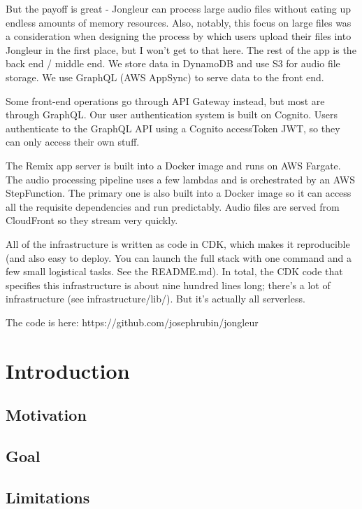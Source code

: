 \documentclass{article}
\begin{document}
But the payoff is great - Jongleur can process large audio files without eating up endless amounts of memory resources.
Also, notably, this focus on large files was a consideration when designing the process by which users upload their files into Jongleur in the first place, but I won't get to that here.
The rest of the app is the back end / middle end. We store data in DynamoDB and use S3 for audio file storage.
We use GraphQL (AWS AppSync) to serve data to the front end.

Some front-end operations go through API Gateway instead, but most are through GraphQL.
Our user authentication system is built on Cognito.
Users authenticate to the GraphQL API using a Cognito accessToken JWT, so they can only access their own stuff.

The Remix app server is built into a Docker image and runs on AWS Fargate.
The audio processing pipeline uses a few lambdas and is orchestrated by an AWS StepFunction.
The primary one is also built into a Docker image so it can access all the requisite dependencies and run predictably.
Audio files are served from CloudFront so they stream very quickly.

All of the infrastructure is written as code in CDK, which makes it reproducible (and also easy to deploy. You can launch the full stack with one command and a few small logistical tasks. See the README.md).
In total, the CDK code that specifies this infrastructure is about nine hundred lines long; there's a lot of infrastructure (see infrastructure/lib/).
But it's actually all serverless.

The code is here: https://github.com/josephrubin/jongleur


\section{Introduction}
\subsection{Motivation} 

\subsection{Goal}

\subsection{Limitations}
\end{document}
